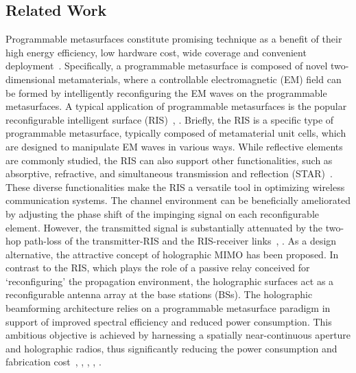 \documentclass[lettersize,journal]{IEEEtran}
\theoremstyle{remark}
\begin{document}
\subsection{Related Work}
Programmable metasurfaces constitute promising technique as a benefit of their high energy efficiency, low hardware cost, wide coverage and convenient deployment~\cite{you2020channel}. Specifically, a programmable metasurface is composed of novel two-dimensional metamaterials, where a controllable electromagnetic (EM) field can be formed by intelligently reconfiguring the EM waves on the programmable metasurfaces. A typical application of programmable metasurfaces is the popular reconfigurable intelligent surface (RIS)~\cite{li2022reconfigurable}, \cite{li2024low}. Briefly, the RIS is a specific type of programmable metasurface, typically composed of metamaterial unit cells, which are designed to manipulate EM waves in various ways. While reflective elements are commonly studied, the RIS can also support other functionalities, such as absorptive, refractive, and simultaneous transmission and reflection (STAR)~\cite{li2018metasurfaces}. These diverse functionalities make the RIS a versatile tool in optimizing wireless communication systems. The channel environment can be beneficially ameliorated by adjusting the phase shift of the impinging signal on each reconfigurable element. However, the transmitted signal is substantially attenuated by the two-hop path-loss of the transmitter-RIS and the RIS-receiver links~\cite{pan2021reconfigurable}, \cite{pan2022overview}. As a design alternative, the attractive concept of holographic MIMO has been proposed. In contrast to the RIS, which plays the role of a passive relay conceived for `reconfiguring' the propagation environment, the holographic surfaces act as a reconfigurable antenna array at the base stations (BSs). The holographic beamforming architecture relies on a programmable metasurface paradigm in support of improved spectral efficiency and reduced power consumption. This ambitious objective is achieved by harnessing a spatially near-continuous aperture and holographic radios, thus significantly reducing the power consumption and fabrication cost~\cite{huang2020holographic}, \cite{li2024achievable}, \cite{yoo2023sub}, \cite{deng2023reconfigurable}, \cite{gong2024holographic}.
\end{document}
